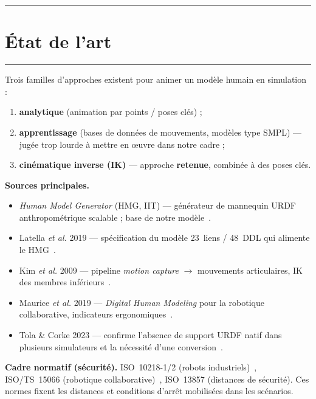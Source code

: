 \documentclass[12pt]{article}
\newcommand{\barre}{\noindent\textcolor{supmerange}{\rule{\textwidth}{3pt}}}
\newcommand{\rsection}[1]{%
  \barre\par\vspace{2pt}%
  \section{#1}%
  \vspace{-6pt}\barre\par\vspace{0.7em}}
\begin{document}


\rsection{État de l'art}

Trois familles d'approches existent pour animer un modèle humain en simulation :
\begin{enumerate}[noitemsep]
  \item \textbf{analytique} (animation par points / poses clés) ;
  \item \textbf{apprentissage} (bases de données de mouvements, modèles type SMPL) --- jugée trop lourde à mettre en \oe uvre dans notre cadre ;
  \item \textbf{cinématique inverse (IK)} --- approche \textbf{retenue}, combinée à des poses clés.
\end{enumerate}

\medskip
\noindent\textbf{Sources principales.}
\begin{itemize}[noitemsep]
  \item \emph{Human Model Generator} (HMG, IIT) --- générateur de mannequin URDF
        anthropométrique scalable ; base de notre modèle~\cite{hmg}.
  \item Latella \emph{et al.} 2019 --- spécification du modèle 23~liens / 48~DDL
        qui alimente le HMG~\cite{latella2019}.
  \item Kim \emph{et al.} 2009 --- pipeline \emph{motion capture} $\rightarrow$
        mouvements articulaires, IK des membres inférieurs~\cite{kim2009}.
  \item Maurice \emph{et al.} 2019 --- \emph{Digital Human Modeling} pour la
        robotique collaborative, indicateurs ergonomiques~\cite{maurice2019}.
  \item Tola \& Corke 2023 --- confirme l'absence de support URDF natif dans
        plusieurs simulateurs et la nécessité d'une conversion~\cite{tola2023}.
\end{itemize}

\medskip
\noindent\textbf{Cadre normatif (sécurité).} ISO~10218-1/2 (robots
industriels)~\cite{iso10218}, ISO/TS~15066 (robotique
collaborative)~\cite{isots15066}, ISO~13857 (distances de sécurité). Ces normes
fixent les distances et conditions d'arrêt mobilisées dans les scénarios.
\end{document}
